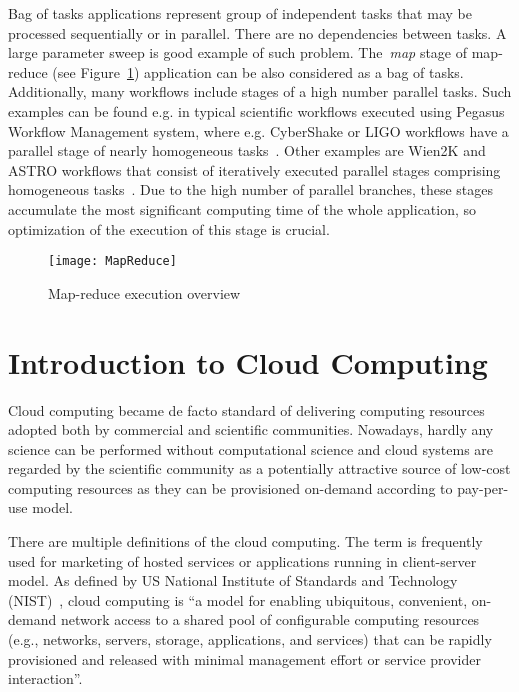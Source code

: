 Bag of tasks applications represent group of independent tasks that may be processed sequentially or in parallel. There are no dependencies between tasks. A large parameter sweep is good example of such problem. The \emph{map} stage of map-reduce (see Figure~\ref{fig:intro:mapreduce}) application can be also considered as a bag of tasks. Additionally, many workflows include stages of a high number parallel tasks. Such examples can be found e.g. in typical scientific workflows executed using Pegasus Workflow Management system, where e.g. CyberShake or LIGO workflows have a parallel stage of nearly homogeneous tasks~\cite{Bharathi08}. Other examples are Wien2K and ASTRO workflows that consist of iteratively executed parallel stages comprising homogeneous tasks~\cite{Duan12}. Due to the high number of parallel branches, these stages accumulate the most significant computing time of the whole application, so optimization of the execution of this stage is crucial.


\begin{figure}[tb]
   \centering
   \texttt{[image: MapReduce]}  
   \caption{Map-reduce execution overview\cite{Dean:2008:MapReduce}}
   \label{fig:intro:mapreduce}
\end{figure} 


\section{Introduction to Cloud Computing}
\label{intro:cloud}

Cloud computing became de facto standard of delivering computing resources adopted both by commercial and scientific communities. Nowadays, hardly any science can be performed without computational science and cloud systems are regarded by the scientific community as a potentially attractive source of low-cost computing resources as they can be provisioned on-demand according to pay-per-use model. 

There are multiple definitions of the cloud computing. The term is frequently used for marketing of hosted services or applications running in client-server model. As defined by US National Institute of Standards and Technology (NIST)~\cite{NISTCloudDef}, cloud computing is “a model for enabling ubiquitous, convenient, on-demand network access to a shared pool of configurable computing resources (e.g., networks, servers, storage, applications, and services) that can be rapidly provisioned and released with minimal management effort or service provider interaction”.

